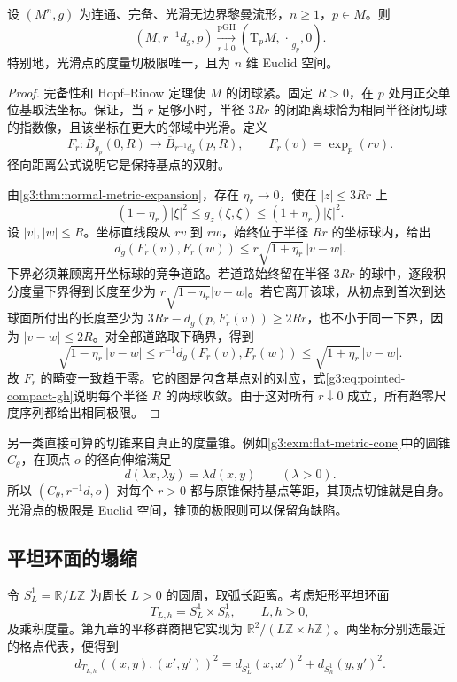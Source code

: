 \begin{theorem}\label{g3:thm:smooth-riemannian-tangent}
	设 \((M^n,g)\) 为连通、完备、光滑无边界黎曼流形，\(n\ge1\)，\(p\in M\)。则
	\[
		(M,r^{-1}d_g,p)\xrightarrow[r\downarrow0]{\mathrm{pGH}}
		(\mathrm T_pM,|\cdot|_{g_p},0).
	\]
	特别地，光滑点的度量切极限唯一，且为 \(n\) 维 Euclid 空间。
\end{theorem}
\begin{proof}
	完备性和 Hopf--Rinow 定理使 \(M\) 的闭球紧。固定 \(R>0\)，在 \(p\) 处用正交单位基取法坐标。保证，当 \(r\) 足够小时，半径 \(3Rr\) 的闭距离球恰为相同半径闭切球的指数像，且该坐标在更大的邻域中光滑。定义
	\[
		F_r:\overline B_{g_p}(0,R)\longrightarrow
		\overline B_{r^{-1}d_g}(p,R),\qquad F_r(v)=\exp_p(rv).
	\]
	径向距离公式说明它是保持基点的双射。

	由\cref{g3:thm:normal-metric-expansion}，存在 \(\eta_r\to0\)，使在 \(|z|\le3Rr\) 上
	\[
		(1-\eta_r)|\xi|^2\le g_z(\xi,\xi)
		\le(1+\eta_r)|\xi|^2.
	\]
	设 \(|v|,|w|\le R\)。坐标直线段从 \(rv\) 到 \(rw\)，始终位于半径 \(Rr\) 的坐标球内，给出
	\[
		d_g(F_r(v),F_r(w))\le r\sqrt{1+\eta_r}\,|v-w|.
	\]
	下界必须兼顾离开坐标球的竞争道路。若道路始终留在半径 \(3Rr\) 的球中，逐段积分度量下界得到长度至少为 \(r\sqrt{1-\eta_r}|v-w|\)。若它离开该球，从初点到首次到达球面所付出的长度至少为
	\(3Rr-d_g(p,F_r(v))\ge2Rr\)，也不小于同一下界，因为 \(|v-w|\le2R\)。对全部道路取下确界，得到
	\[
		\sqrt{1-\eta_r}\,|v-w|
		\le r^{-1}d_g(F_r(v),F_r(w))
		\le\sqrt{1+\eta_r}\,|v-w|.
	\]
	故 \(F_r\) 的畸变一致趋于零。它的图是包含基点对的对应，式\eqref{g3:eq:pointed-compact-gh}说明每个半径 \(R\) 的两球收敛。由于这对所有 \(r\downarrow0\) 成立，所有趋零尺度序列都给出相同极限。
\end{proof}

另一类直接可算的切锥来自真正的度量锥。例如\cref{g3:exm:flat-metric-cone}中的圆锥 \(C_\theta\)，在顶点 \(o\) 的径向伸缩满足
\[
	d(\lambda x,\lambda y)=\lambda d(x,y)\qquad(\lambda>0).
\]
所以 \((C_\theta,r^{-1}d,o)\) 对每个 \(r>0\) 都与原锥保持基点等距，其顶点切锥就是自身。光滑点的极限是 Euclid 空间，锥顶的极限则可以保留角缺陷。

\subsection{平坦环面的塌缩}
\label{g3:subsec:1004:03}
令 \(S^1_L=\mathbb R/L\mathbb Z\) 为周长 \(L>0\) 的圆周，取弧长距离。考虑矩形平坦环面
\[
	T_{L,h}=S^1_L\times S^1_h,\qquad L,h>0,
\]
及乘积度量。第九章的平移群商把它实现为
\(\mathbb R^2/(L\mathbb Z\times h\mathbb Z)\)。两坐标分别选最近的格点代表，便得到
\begin{equation}\label{g3:eq:thin-torus-distance}
	d_{T_{L,h}}((x,y),(x',y'))^2
	=d_{S^1_L}(x,x')^2+d_{S^1_h}(y,y')^2.
\end{equation}

